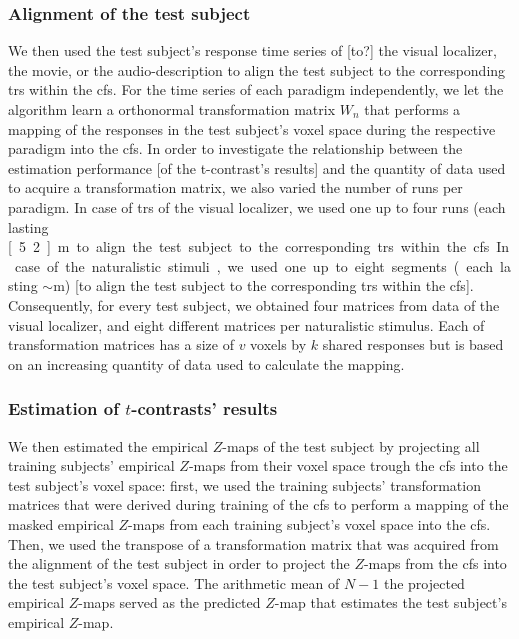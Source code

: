 \subsubsection{Alignment of the test subject}




%
We then used the test subject's response time series of [to?] the visual
localizer, the movie, or the audio-description to align the test subject to the
corresponding \acp{tr} within the \ac{cfs}.
%
For the time series of each paradigm independently, we let the algorithm learn a
orthonormal transformation matrix $W_{n}$ that performs a mapping of the
responses in the test subject's voxel space during the respective paradigm into
the \ac{cfs}.
%
In order to investigate the relationship between the estimation performance [of
the t-contrast's results] and the quantity of data used to acquire a
transformation matrix, we also varied the number of runs per paradigm.
%
In case of \acp{tr} of the visual localizer, we used one up to four runs (each
lasting \unit[5.2]{m} to align the test subject to the corresponding \acp{tr}
within the \ac{cfs}.
%
In case of the naturalistic stimuli, we used one up to eight segments (each
lasting $\sim$\unit[15]{m}) [to align the test subject to the corresponding
\acp{tr} within the \ac{cfs}].
%
Consequently, for every test subject, we obtained four matrices from data of the
visual localizer, and eight different matrices per naturalistic stimulus.
%
Each of transformation matrices has a size of $v$ voxels by $k$ shared responses
but is based on an increasing quantity of data used to calculate the mapping.


\subsubsection{Estimation of $t$-contrasts' results}

We then estimated the empirical $Z$-maps of the test subject by projecting all
training subjects' empirical $Z$-maps from their voxel space trough the \ac{cfs}
into the test subject's voxel space:
first, we used the training subjects' transformation matrices that were derived
during training of the \ac{cfs} to perform a mapping of the masked empirical
$Z$-maps from each training subject's voxel space into the \ac{cfs}.
Then, we used the transpose of a transformation matrix that was acquired from
the alignment of the test subject in order to project the $Z$-maps from the
\ac{cfs} into the test subject's voxel space.
The arithmetic mean of $N-1$ the projected empirical $Z$-maps served as the
predicted $Z$-map that estimates the test subject's empirical $Z$-map.



